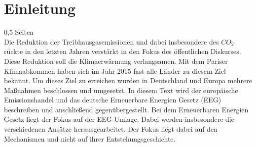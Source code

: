 \chapter{Einleitung}
0,5 Seiten\\
Die Reduktion der Treibhausgasemissionen und dabei insbesondere des $CO_2$ rückte in den letzten Jahren verstärkt in den Fokus des öffentlichen Diskurses.
Diese Reduktion soll die Klimaerwärmung verlangsamen.
Mit dem Pariser Klimaabkommen haben sich im Jahr 2015 fast alle Länder zu diesem Ziel bekannt.
Um dieses Ziel zu erreichen wurden in Deutschland und Europa mehrere Maßnahmen beschlossen und umgesetzt.
In diesem Text wird der europäische Emissionshandel und das deutsche Erneuerbare Energien Gesetz (EEG) beschreiben und anschließend gegenübergestellt. 
Bei dem Erneuerbaren Energien Gesetz liegt der Fokus auf der EEG-Umlage.
Dabei werden insbesondere die verschiedenen Ansätze herausgearbeitet.
Der Fokus liegt dabei auf den Mechanismen und nicht auf ihrer Entstehungsgeschichte.
